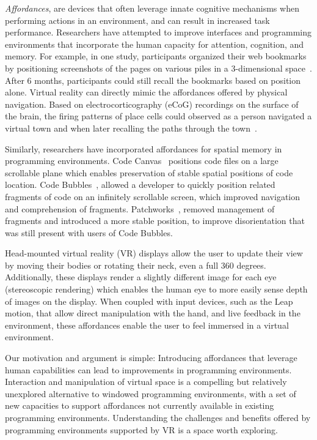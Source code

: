 \documentclass[conference]{IEEEtran}
\begin{document}
\emph{Affordances}, are devices that often leverage innate cognitive mechanisms when performing actions in an environment, and can result in increased task performance. 
Researchers have attempted to improve interfaces and programming environments that incorporate the human capacity for attention, cognition, and memory.
For example, in one study, participants organized their web bookmarks by positioning screenshots of the pages on various piles in a 3-dimensional space~\cite{Robertson:1998}. 
After 6 months, participants could still recall the bookmarks based on position alone.  Virtual reality can directly mimic the affordances offered by physical navigation. Based on electrocorticography (eCoG) recordings on the surface of the brain, the firing patterns of place cells could observed as a person navigated a virtual town and when later recalling the paths through the town~\cite{Ekstrom:2003}.

Similarly, researchers have incorporated affordances for spatial memory in programming environments.  Code Canvas~\cite{DeLine:CodeCanvas} positions code files on a large scrollable plane which enables preservation of stable spatial positions of code location.  Code Bubbles~\cite{Bragdon:CodeBubbles}, allowed a developer to quickly position related fragments of code on an infinitely scrollable screen, which improved navigation and comprehension of fragments.  Patchworks~\cite{Henley:2014}, removed management of fragments and introduced a more stable position, to improve disorientation that was still present with users of Code Bubbles.

Head-mounted virtual reality (VR) displays allow the user to update their view by moving their bodies or rotating their neck, even a full 360 degrees.
Additionally, these displays render a slightly different image for each eye (stereoscopic rendering) which enables the human eye to more easily sense depth of images on the display.
When coupled with input devices, such as the Leap motion, that allow direct manipulation with the hand, and live feedback in the environment, these affordances enable the user to feel immersed in a virtual environment.


Our motivation and argument is simple: 
Introducing affordances that leverage human capabilities can lead to improvements in programming environments.
Interaction and manipulation of virtual space is a compelling but relatively unexplored alternative to windowed programming environments, with a set of new capacities to support affordances not currently available in existing programming environments.   Understanding the challenges and benefits offered by programming environments supported by VR is a space worth exploring.
\end{document}

